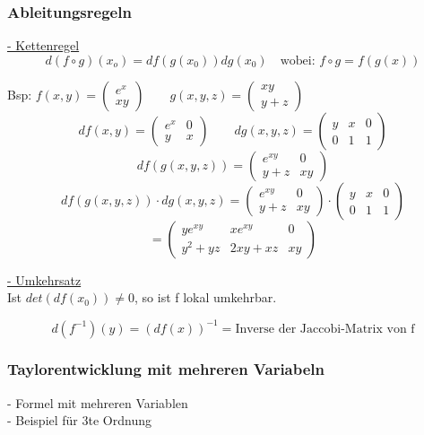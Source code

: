 \documentclass[6pt]{article}
\begin{document}
\begin{multicols*}{3}
	
	\subsubsection*{Ableitungsregeln}
		\underline{- Kettenregel} \\
		\[ d\left(f \circ g\right)(x_o) = df\left(g(x_0)\right) dg(x_0) \quad \text{wobei: }f \circ g  = f(g(x))\]
		
		Bsp: \quad $ f(x,y)=\begin{pmatrix} e^x \\ xy \end{pmatrix} \qquad g(x,y,z) = \begin{pmatrix}xy\\y+z\end{pmatrix} $ \\
		\[
				df(x,y)=\begin{pmatrix} e^x & 0 \\ y & x\end{pmatrix} \qquad
				 dg(x,y,z)=\begin{pmatrix} y & x & 0 \\ 0 & 1 & 1 \end{pmatrix}  
		\]
		\[
				df(g(x,y,z)) = \begin{pmatrix} e^{xy} & 0 \\ y+z & xy\end{pmatrix}
		\]
		\[
				df(g(x,y,z)) \cdot dg(x,y,z)= \begin{pmatrix} e^{xy} & 0 \\ y+z & xy\end{pmatrix} \cdot \begin{pmatrix} y & x & 0 \\ 0 & 1 & 1 \end{pmatrix}  
		\]
		\[
				= \begin{pmatrix} ye^{xy} & xe^{xy} & 0 \\ y^2 + yz & 2xy + xz & xy \end{pmatrix}
		\]
		
		\underline{- Umkehrsatz} \vspace{1mm}\\
		Ist $det(df(x_0)) \not = 0$, so ist f lokal umkehrbar. 
		
		\[
				d(f^{-1})(y) = (df(x))^{-1} = \text{Inverse der Jaccobi-Matrix von f}
		\]		

	
	\subsubsection*{Taylorentwicklung mit mehreren Variabeln}
	- Formel mit mehreren Variablen \\
	- Beispiel für 3te Ordnung
	 

\end{multicols*}
\end{document}
